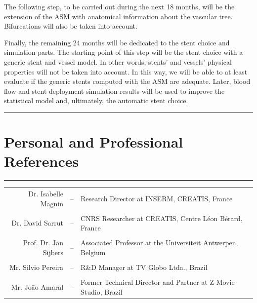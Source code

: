 \documentclass[a4paper]{article}
\begin{document}
The following step, to be carried out during the next 18 months, will be the extension of the ASM with anatomical information about the vascular tree. Bifurcations will also be taken into account. 

Finally, the remaining 24 months will be dedicated to the stent choice and simulation parts. The starting point of this step will be the stent choice with a generic stent and vessel model. In other words, stents' and vessels' physical properties will not be taken into account. In this way, we will be able to at least evaluate if the generic stents computed with the ASM are adequate. Later, blood flow and stent deployment simulation results will be used to improve the statistical model and, ultimately, the automatic stent choice.  




\pagebreak

\medskip
\medskip

\hrule
\section{Personal and Professional References}
\hrule

\medskip
\medskip

\medskip
\medskip

\begin{center}
\begin{tabular}{r c l}
Dr. Isabelle Magnin & -- & Research Director at INSERM, CREATIS, France\\
\\
Dr. David Sarrut & -- & CNRS Researcher at CREATIS, Centre L\'eon B\'erard, France\\
\\
Prof. Dr. Jan Sijbers & -- & Associated Professor at the Universiteit Antwerpen, Belgium \\
\\
Mr. Silvio Pereira & -- & R\&D Manager at TV Globo Ltda., Brazil \\
\\
Mr. Jo\~ao Amaral & -- & Former Technical Director and Partner at Z-Movie Studio, Brazil \\
\end{tabular}
\end{center}
\vfill







\end{document}

